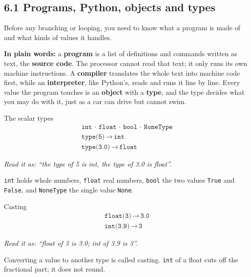 \documentclass[11pt]{article}
\begin{document}
\begin{keepsection}
\section{6.1 Programs, Python, objects and types}

Before any branching or looping, you need to know what a program is made of and what kinds of values it handles.

\begin{plainbox}\textbf{In plain words:} a \textbf{program} is a list of definitions and commands written as text, the \textbf{source code}. The processor cannot read that text; it only runs its own machine instructions. A \textbf{compiler} translates the whole text into machine code first, while an \textbf{interpreter}, like Python’s, reads and runs it line by line. Every value the program touches is an \textbf{object} with a \textbf{type}, and the type decides what you may do with it, just as a car can drive but cannot swim.\end{plainbox}

\begin{equationcard}{The scalar types}
\[ \begin{gathered} \texttt{int}\, \cdot \, \texttt{float}\, \cdot \, \texttt{bool}\, \cdot \, \texttt{NoneType} \\ \texttt{type(5)}\, \to \, \texttt{int} \\ \texttt{type(3.0)}\, \to \, \texttt{float} \end{gathered} \]
{\small \emph{Read it as: “the type of 5 is int, the type of 3.0 is float”.}\par  \texttt{int} holds whole numbers, \texttt{float} real numbers, \texttt{bool} the two values \texttt{True} and \texttt{False}, and \texttt{NoneType} the single value \texttt{None}.}
\end{equationcard}

\begin{equationcard}{Casting}
\[ \begin{gathered} \texttt{float(3)}\, \to \, \texttt{3.0} \\ \texttt{int(3.9)}\, \to \, \texttt{3} \end{gathered} \]
{\small \emph{Read it as: “float of 3 is 3.0; int of 3.9 is 3”.}\par  Converting a value to another type is called casting. \texttt{int} of a float cuts off the fractional part; it does not round.}
\end{equationcard}


\end{keepsection}
\end{document}
